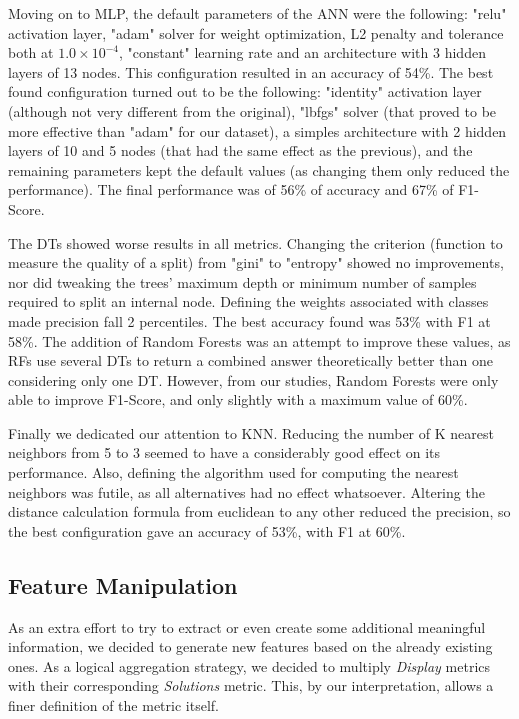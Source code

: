 \documentclass[extendedabs]{recpad2k}
\begin{document}
Moving on to MLP, the default parameters of the ANN were the following:
"relu" activation layer, "adam" solver for weight optimization, L2 penalty and tolerance both at $1.0 \times 10^{-4}$, "constant" learning rate and an 
architecture with 3 hidden layers of 13 nodes.
This configuration resulted in an accuracy of 54\%.
The best found configuration turned out to be the following: "identity" activation layer (although not very different from the original), "lbfgs" solver (that 
proved to be more effective than "adam" for our dataset), a simples architecture with 2 hidden layers of 10 and 5 nodes (that had the same effect as the previous), 
and the remaining parameters kept the default values (as changing them only reduced the performance).
The final performance was of 56\% of accuracy and 67\% of F1-Score.

The DTs showed worse results in all metrics.
Changing the criterion (function to measure the quality of a split) from "gini" to "entropy" showed no improvements, nor did tweaking the trees' maximum depth 
or minimum number of samples required to split an internal node.
Defining the weights associated with classes made precision fall 2 percentiles.
The best accuracy found was 53\% with F1 at 58\%.
The addition of Random Forests was an attempt to improve these values, as RFs use several DTs to return a combined answer theoretically better than one 
considering only one DT.
However, from our studies, Random Forests were only able to improve F1-Score, and only slightly with a maximum value of 60\%.

Finally we dedicated our attention to KNN.
Reducing the number of K nearest neighbors from 5 to 3 seemed to have a considerably good effect on its performance.
Also, defining the algorithm used for computing the nearest neighbors was futile, as all alternatives had no effect whatsoever.
Altering the distance calculation formula from euclidean to any other reduced the precision, so the best configuration gave an accuracy of 53\%, with F1 at 60\%.

\subsection{Feature Manipulation}

As an extra effort to try to extract or even create some additional meaningful information, we decided to generate new features based on the already existing ones. 
As a logical aggregation strategy, we decided to multiply \textit{Display} metrics with their corresponding \textit{Solutions} metric. 
This, by our interpretation, allows a finer definition of the metric itself.
\end{document}

